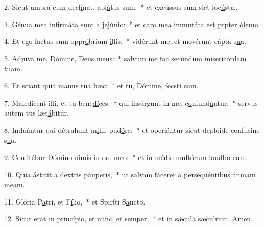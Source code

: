 2. Sicut umbra cum decl\uline{í}nat, abl\uline{á}tus sum:~* et excússus sum sict loc\uline{ú}stæ.\par 
3. Génua mea infirmáta sunt \uline{a} jej\uline{ú}nio:~* et caro mea immutáta est prpter \uline{ó}leum.\par 
4. Et ego factus sum oppr\uline{ó}brium \uline{i}llis:~* vidérunt me, et movérunt cápta s\uline{u}a.\par 
5. Adjuva me, Dómine, D\uline{e}us m\uline{e}us:~* salvum me fac secúndum misericórdam t\uline{u}am.\par 
6. Et sciant quia m\uline{a}nus t\uline{u}a hæc:~* et tu, Dómine, fecsti \uline{e}am.\par 
7. Maledícent illi, et tu bene\uline{dí}ces:~† qui insúrgunt in me, c\uline{o}nfund\uline{á}ntur:~* servus autem tus læt\uline{á}bitur.\par 
8. Induántur qui détrahunt m\uline{i}hi, pud\uline{ó}re:~* et operiántur sicut deplóide confusine s\uline{u}a.\par 
9. Confitébor Dómino nimis in \uline{o}re m\uline{e}o:~* et in médio multórum laudbo \uline{e}um.\par 
10. Quia ástitit a d\uline{e}xtris p\uline{áu}peris,~* ut salvam fáceret a persequéntibus ánmam m\uline{e}am.\par 
11. Glória P\uline{a}tri, et F\uline{í}lio,~* et Spiríti S\uline{a}ncto.\par 
12. Sicut erat in princípio, et n\uline{u}nc, et s\uline{e}mper,~* et in sǽcula sæculrum. \uline{A}men.\par 
